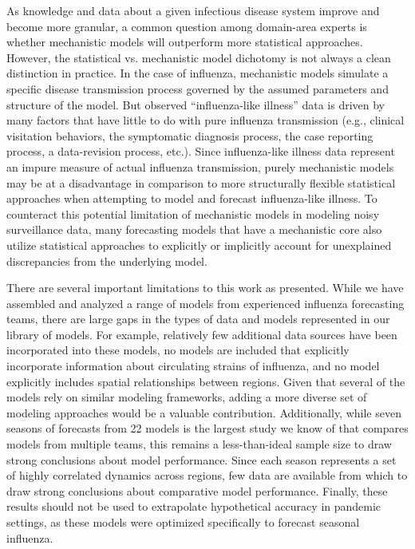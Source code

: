 \documentclass[9pt,twocolumn,twoside]{pnas-new}\usepackage[]{graphicx}\usepackage[]{color}
\begin{document}
As knowledge and data about a given infectious disease system improve and become more granular, a common question among domain-area experts is whether mechanistic models will outperform more statistical approaches.
However, the statistical vs. mechanistic model dichotomy is not always a clean distinction in practice.
In the case of influenza, mechanistic models simulate a specific disease transmission process governed by the assumed parameters and structure of the model. 
But observed ``influenza-like illness'' data is driven by many factors that have little to do with pure influenza transmission (e.g., clinical visitation behaviors, the symptomatic diagnosis process, the case reporting process, a data-revision process, etc.). 
Since influenza-like illness data represent an impure measure of actual influenza transmission, purely mechanistic models may be at a disadvantage in comparison to more structurally flexible statistical approaches when attempting to model and forecast influenza-like illness.
To counteract this potential limitation of mechanistic models in modeling noisy surveillance data, many forecasting models that have a mechanistic core also utilize statistical approaches to explicitly or implicitly account for unexplained discrepancies from the underlying model.\cite{Pei2017,osthus2018dynamic}

There are several important limitations to this work as presented.
While we have assembled and analyzed a range of models from experienced influenza forecasting teams, there are large gaps in the types of data and models represented in our library of models.
For example, relatively few additional data sources have been incorporated into these models, no models are included that explicitly incorporate information about circulating strains of influenza, and no model explicitly includes spatial relationships between regions.
Given that several of the models rely on similar modeling frameworks, adding a more diverse set of modeling approaches would be a valuable contribution.
Additionally, while seven seasons of forecasts from 22 models is the largest study we know of that compares models from multiple teams, this remains a less-than-ideal sample size to draw strong conclusions about model performance. 
Since each season represents a set of highly correlated dynamics across regions, few data are available from which to draw strong conclusions about comparative model performance.
Finally, these results should not be used to extrapolate hypothetical accuracy in pandemic settings, as these models were optimized specifically to forecast seasonal influenza.
\end{document}
